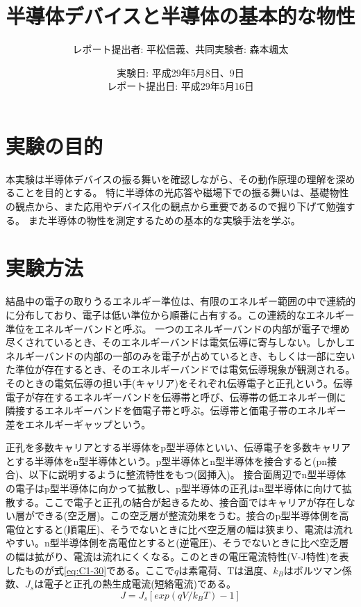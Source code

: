 \documentclass[11pt,a4]{jarticle}
\begin{document}
\title{半導体デバイスと半導体の基本的な物性}
\author{レポート提出者: 平松信義、共同実験者: 森本颯太}
\date{実験日: 平成29年5月8日、9日\\レポート提出日: 平成29年5月16日}
\maketitle
\tableofcontents

\section{実験の目的}
本実験は半導体デバイスの振る舞いを確認しながら、その動作原理の理解を深めることを目的とする。
特に半導体の光応答や磁場下での振る舞いは、基礎物性の観点から、また応用やデバイス化の観点から重要であるので掘り下げて勉強する。
また半導体の物性を測定するための基本的な実験手法を学ぶ。

\section{実験方法}
結晶中の電子の取りうるエネルギー準位は、有限のエネルギー範囲の中で連続的に分布しており、電子は低い準位から順番に占有する。この連続的なエネルギー準位をエネルギーバンドと呼ぶ。
一つのエネルギーバンドの内部が電子で埋め尽くされているとき、そのエネルギーバンドは電気伝導に寄与しない。しかしエネルギーバンドの内部の一部のみを電子が占めているとき、もしくは一部に空いた準位が存在するとき、そのエネルギーバンドでは電気伝導現象が観測される。そのときの電気伝導の担い手(キャリア)をそれぞれ伝導電子と正孔という。伝導電子が存在するエネルギーバンドを伝導帯と呼び、伝導帯の低エネルギー側に隣接するエネルギーバンドを価電子帯と呼ぶ。伝導帯と価電子帯のエネルギー差をエネルギーギャップという。

正孔を多数キャリアとする半導体をp型半導体といい、伝導電子を多数キャリアとする半導体をn型半導体という。p型半導体とn型半導体を接合すると(pn接合)、以下に説明するように整流特性をもつ(図挿入)。
接合面周辺でn型半導体の電子はp型半導体に向かって拡散し、p型半導体の正孔はn型半導体に向けて拡散する。ここで電子と正孔の結合が起きるため、接合面ではキャリアが存在しない層ができる(空乏層)。この空乏層が整流効果をうむ。接合のp型半導体側を高電位とすると(順電圧)、そうでないときに比べ空乏層の幅は狭まり、電流は流れやすい。n型半導体側を高電位とすると(逆電圧)、そうでないときに比べ空乏層の幅は拡がり、電流は流れにくくなる。このときの電圧電流特性(V-J特性)を表したものが式\ref{eq:C1-30}である。ここで$q$は素電荷、Tは温度、$k_B$はボルツマン係数、$J_s$は電子と正孔の熱生成電流(短絡電流)である。
\begin{equation}
J  = J_s[ exp(qV/ k_B T)- 1]
\label{eq:C1-30}
\end{equation}
\end{document}
